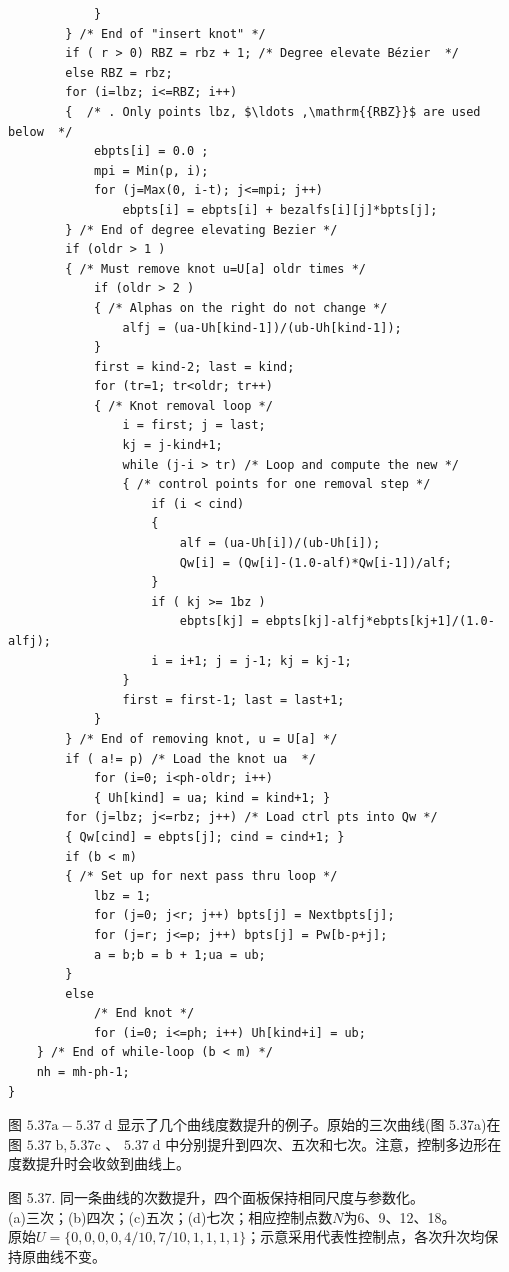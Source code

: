 \documentclass[../main.tex]{subfiles}
\begin{document}
\begin{verbatim}
            }
        } /* End of "insert knot" */
        if ( r > 0) RBZ = rbz + 1; /* Degree elevate Bézier  */
        else RBZ = rbz;
        for (i=lbz; i<=RBZ; i++)
        {  /* . Only points lbz, $\ldots ,\mathrm{{RBZ}}$ are used below  */
            ebpts[i] = 0.0 ;
            mpi = Min(p, i);
            for (j=Max(0, i-t); j<=mpi; j++)
                ebpts[i] = ebpts[i] + bezalfs[i][j]*bpts[j];
        } /* End of degree elevating Bezier */
        if (oldr > 1 )
        { /* Must remove knot u=U[a] oldr times */
            if (oldr > 2 )
            { /* Alphas on the right do not change */
                alfj = (ua-Uh[kind-1])/(ub-Uh[kind-1]);
            }
            first = kind-2; last = kind;
            for (tr=1; tr<oldr; tr++)
            { /* Knot removal loop */
                i = first; j = last;
                kj = j-kind+1;
                while (j-i > tr) /* Loop and compute the new */
                { /* control points for one removal step */
                    if (i < cind)
                    {
                        alf = (ua-Uh[i])/(ub-Uh[i]);
                        Qw[i] = (Qw[i]-(1.0-alf)*Qw[i-1])/alf;
                    }
                    if ( kj >= 1bz )
                        ebpts[kj] = ebpts[kj]-alfj*ebpts[kj+1]/(1.0-alfj);
                    i = i+1; j = j-1; kj = kj-1;
                }
                first = first-1; last = last+1;
            }
        } /* End of removing knot, u = U[a] */
        if ( a!= p) /* Load the knot ua  */
            for (i=0; i<ph-oldr; i++)
            { Uh[kind] = ua; kind = kind+1; }
        for (j=lbz; j<=rbz; j++) /* Load ctrl pts into Qw */
        { Qw[cind] = ebpts[j]; cind = cind+1; }
        if (b < m)
        { /* Set up for next pass thru loop */
            lbz = 1;
            for (j=0; j<r; j++) bpts[j] = Nextbpts[j];
            for (j=r; j<=p; j++) bpts[j] = Pw[b-p+j];
            a = b;b = b + 1;ua = ub;
        }
        else
            /* End knot */
            for (i=0; i<=ph; i++) Uh[kind+i] = ub;
    } /* End of while-loop (b < m) */
    nh = mh-ph-1;
}
\end{verbatim}

图 \({5.37}\mathrm{a} - {5.37}\mathrm{\;d}\) 显示了几个曲线度数提升的例子。原始的三次曲线(图 5.37a)在图 \({5.37}\mathrm{\;b},{5.37}\mathrm{c}\) 、 \({5.37}\mathrm{\;d}\) 中分别提升到四次、五次和七次。注意，控制多边形在度数提升时会收敛到曲线上。

\begin{center}
\begin{minipage}{25.6cm}
\vspace*{.6\baselineskip}
\centering
{}
\par\medskip
{}
\par\smallskip
图 5.37. 同一条曲线的次数提升，四个面板保持相同尺度与参数化。\\
(a)三次；(b)四次；(c)五次；(d)七次；相应控制点数$N$为6、9、12、18。\\
原始$U=\{0,0,0,0,4/10,7/10,1,1,1,1\}$；示意采用代表性控制点，各次升次均保持原曲线不变。
\end{minipage}
\end{center}
\end{document}
